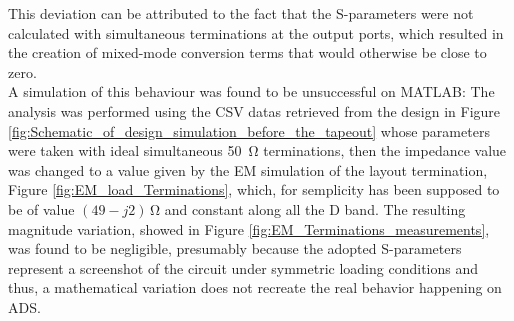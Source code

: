 This deviation can be attributed to the fact that the S-parameters were not calculated with simultaneous terminations at the output ports, which resulted in the creation of mixed-mode conversion terms that would otherwise be close to zero.
\\
A simulation of this behaviour was found to be unsuccessful on MATLAB: The analysis was performed using the CSV datas retrieved from the design in Figure \ref{fig:Schematic_of_design_simulation_before_the_tapeout} whose parameters were taken with ideal simultaneous \SI{50}{\ohm} terminations, then the impedance value was changed to a value given by the EM simulation of the layout termination, Figure \ref{fig:EM_load_Terminations}, which, for semplicity has been supposed to be of value $(49-j2)\,\si{\ohm}$ and constant along all the D band. The resulting magnitude variation, showed in Figure \ref{fig:EM_Terminations_measurements}, was found to be negligible, presumably because the adopted S-parameters represent a screenshot of the circuit under symmetric loading conditions and thus, a mathematical variation does not recreate the real behavior happening on ADS.

